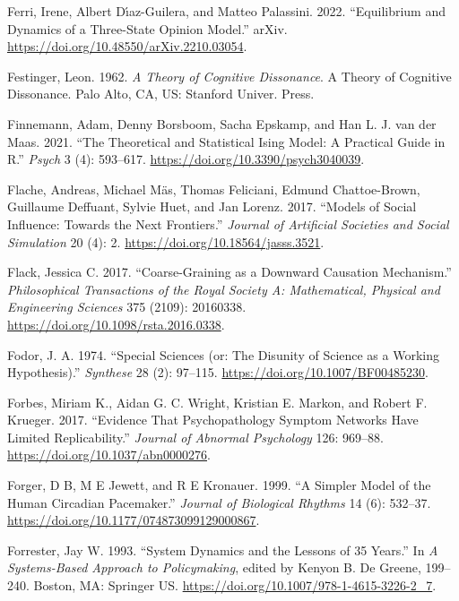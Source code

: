 \documentclass[
  a4paper,
  DIV=11,
  numbers=noendperiod,
  oneside]{scrreprt}
\newlength{\cslhangindent}
\newenvironment{CSLReferences}[2] %
 {\begin{list}{}{%
  \setlength{\itemindent}{0pt}
  \setlength{\leftmargin}{0pt}
  \setlength{\parsep}{0pt}
  \ifodd #1
   \setlength{\leftmargin}{\cslhangindent}
   \setlength{\itemindent}{-1\cslhangindent}
  \fi
  \setlength{\itemsep}{#2\baselineskip}}}
 {\end{list}}
\begin{document}
\begin{CSLReferences}{1}{0}
Ferri, Irene, Albert Dı́az-Guilera, and Matteo Palassini. 2022.
{``Equilibrium and Dynamics of a Three-State Opinion Model.''} {arXiv}.
\url{https://doi.org/10.48550/arXiv.2210.03054}.

Festinger, Leon. 1962. \emph{A Theory of Cognitive Dissonance}. A Theory
of Cognitive Dissonance. {Palo Alto, CA, US}: {Stanford Univer. Press}.

Finnemann, Adam, Denny Borsboom, Sacha Epskamp, and Han L. J. van der
Maas. 2021. {``The Theoretical and Statistical Ising Model: A Practical
Guide in R.''} \emph{Psych} 3 (4): 593--617.
\url{https://doi.org/10.3390/psych3040039}.

Flache, Andreas, Michael Mäs, Thomas Feliciani, Edmund Chattoe-Brown,
Guillaume Deffuant, Sylvie Huet, and Jan Lorenz. 2017. {``Models of
{Social Influence}: {Towards} the {Next Frontiers}.''} \emph{Journal of
Artificial Societies and Social Simulation} 20 (4): 2.
\url{https://doi.org/10.18564/jasss.3521}.

Flack, Jessica C. 2017. {``Coarse-Graining as a Downward Causation
Mechanism.''} \emph{Philosophical Transactions of the Royal Society A:
Mathematical, Physical and Engineering Sciences} 375 (2109): 20160338.
\url{https://doi.org/10.1098/rsta.2016.0338}.

Fodor, J. A. 1974. {``Special Sciences (or: {The} Disunity of Science as
a Working Hypothesis).''} \emph{Synthese} 28 (2): 97--115.
\url{https://doi.org/10.1007/BF00485230}.

Forbes, Miriam K., Aidan G. C. Wright, Kristian E. Markon, and Robert F.
Krueger. 2017. {``Evidence That Psychopathology Symptom Networks Have
Limited Replicability.''} \emph{Journal of Abnormal Psychology} 126:
969--88. \url{https://doi.org/10.1037/abn0000276}.

Forger, D B, M E Jewett, and R E Kronauer. 1999. {``A Simpler Model of
the Human Circadian Pacemaker.''} \emph{Journal of Biological Rhythms}
14 (6): 532--37. \url{https://doi.org/10.1177/074873099129000867}.

Forrester, Jay W. 1993. {``System {Dynamics} and the {Lessons} of 35
{Years}.''} In \emph{A {Systems-Based Approach} to {Policymaking}},
edited by Kenyon B. De Greene, 199--240. {Boston, MA}: {Springer US}.
\url{https://doi.org/10.1007/978-1-4615-3226-2_7}.


\end{CSLReferences}
\end{document}
